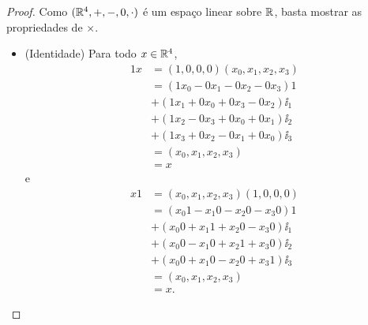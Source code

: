 \begin{proof}
Como $(\mathbb{R}^4,+,-,0,\cdot)$ é um espaço linear sobre $\mathbb{R}$, basta mostrar as propriedades de $\times$.
\begin{itemize}
	\item (Identidade) Para todo $x \in \mathbb{R}^4$,
		\begin{align*}
		1x &= (1,0,0,0)(x_0,x_1,x_2,x_3) \\
			&= (1 x_0 - 0 x_1 - 0 x_2 - 0 x_3)1 \\
			&+ (1 x_1 + 0 x_0 + 0 x_3 - 0 x_2)\ii_1 \\
			&+ (1 x_2 - 0 x_3 + 0 x_0 + 0 x_1)\ii_2 \\
			&+ (1 x_3 + 0 x_2 - 0 x_1 + 0 x_0)\ii_3 \\
			&= (x_0,x_1,x_2,x_3) \\
			&= x
		\end{align*}
	e
		\begin{align*}
		x1 &= (x_0,x_1,x_2,x_3)(1,0,0,0) \\
			&= (x_0 1 - x_1 0 - x_2 0 - x_3 0)1 \\
			&+ (x_0 0 + x_1 1 + x_2 0 - x_3 0)\ii_1 \\
			&+ (x_0 0 - x_1 0 + x_2 1 + x_3 0)\ii_2 \\
			&+ (x_0 0 + x_1 0 - x_2 0 + x_3 1)\ii_3 \\
			&= (x_0,x_1,x_2,x_3) \\
			&= x.
		\end{align*}
	

\end{itemize}
\end{proof}
